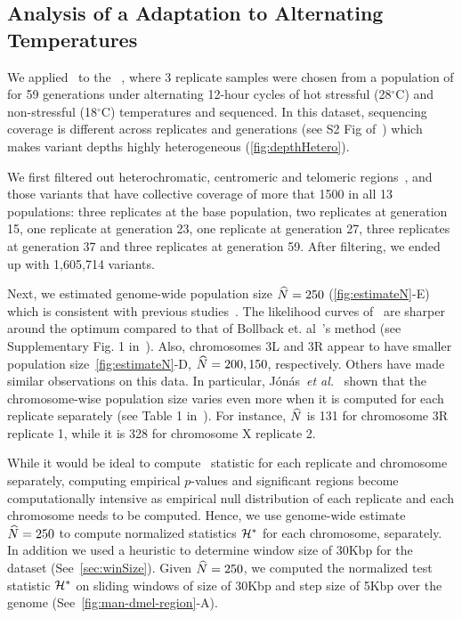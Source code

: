 \subsection{Analysis of a \dmel Adaptation to Alternating 
Temperatures}\label{sec:dmel}
We applied \comale\ to the 
\datadm~\cite{orozco2012adaptation,franssen2015patterns}, where
3 replicate samples were chosen from a population of \dmel for 59
generations under alternating 12-hour cycles of  hot stressful (28$^{\circ}$C)
and non-stressful (18$^{\circ}$C) temperatures and sequenced.  In this dataset,
sequencing coverage is different across replicates and generations
(see S2 Fig of~\cite{Terhorst2015Multi}) which makes variant depths
highly heterogeneous (\ref{fig:depthHetero}). 

We first filtered out heterochromatic, centromeric and telomeric
regions~\cite{fiston2010drosophila}, and those variants that have
collective coverage of more that 1500 in all 13 populations: three
replicates at the base population, two replicates at generation 15,
one replicate at generation 23, one replicate at generation 27, three
replicates at generation 37 and three replicates at generation
59. After filtering, we ended up with 1,605,714 variants.

Next, we estimated genome-wide population size $\widehat{N}=250$
(\ref{fig:estimateN}-E) which is consistent with previous
studies~\cite{orozco2012adaptation,jonas2016estimating}. The
likelihood curves of \comale\ are sharper around the optimum compared
to that of Bollback et. al~\cite{bollback2008estimation}'s method (see
Supplementary Fig. 1 in~\cite{orozco2012adaptation}).  Also,
chromosomes 3L and 3R appear to have smaller population
size~\ref{fig:estimateN}-D, $\widehat{N}=200,150$, respectively. 
Others have
made similar observations on this data. In particular,
J\'{o}n\'{a}s~\emph{et al.}~\cite{jonas2016estimating} shown that the 
chromosome-wise population
size varies even more when it is computed for each replicate
separately (see Table 1 in~\cite{jonas2016estimating}). For instance,
$\widehat{N}$ is 131 for chromosome 3R replicate 1, while it is 328 for chromosome X 
replicate 2.  

While it would be ideal to compute \comale\ statistic for each
replicate and chromosome separately, computing empirical $p$-values
and significant regions become computationally intensive as
empirical null distribution of each replicate and each chromosome
needs to be computed.  
Hence, we use genome-wide estimate $\widehat{N}=250$ to
compute normalized statistics ${\cal H}^*$ for each
chromosome, separately.  
In addition we used a heuristic to determine window size of 30Kbp for the 
\dmel dataset (See~\ref{sec:winSize}). 
Given $\widehat{N}=250$, we
 computed the normalized test statistic
${\cal H}^*$ on sliding windows of size of 30Kbp and step size of 5Kbp
over the genome (See~\ref{fig:man-dmel-region}-A).  

